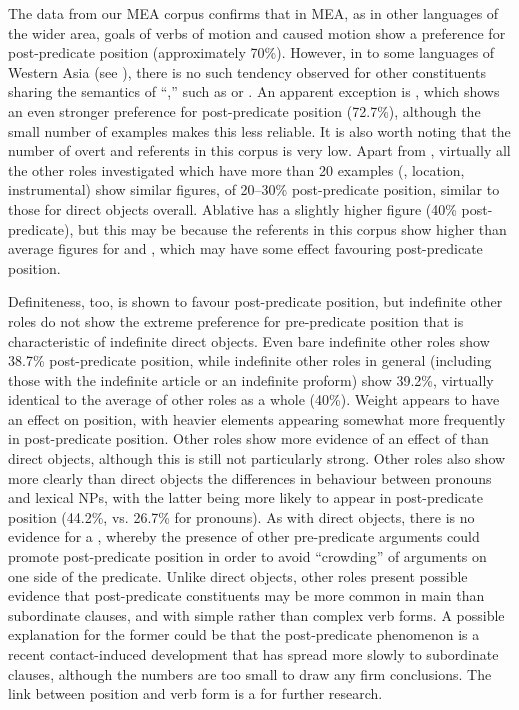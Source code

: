 \documentclass[output=paper,colorlinks,citecolor=brown,draftmode]{langscibook}
\begin{document}
The data from our MEA corpus confirms that in MEA, as in other languages of the wider area, goals of verbs of motion and caused motion show a preference for post-predicate position (approximately 70\%). However, in  to some languages of Western Asia (see ), there is no such tendency observed for other constituents sharing the semantics of ``,'' such as  or . An apparent exception is , which shows an even stronger preference for post-predicate position (72.7\%), although the small number of examples makes this less reliable. It is also worth noting that the number of overt  and  referents in this corpus is very low. Apart from , virtually all the other roles investigated which have more than 20 examples (, location, instrumental) show similar figures, of 20--30\% post-predicate position, similar to those for direct objects overall. Ablative has a slightly higher figure (40\% post-predicate), but this may be because the  referents in this corpus show higher than average figures for  and , which may have some effect favouring post-predicate position.

Definiteness, too, is shown to favour post-predicate position, but indefinite other roles do not show the extreme preference for pre-predicate position that is characteristic of indefinite direct objects. Even bare indefinite other roles show 38.7\% post-predicate position, while indefinite other roles in general (including those with the indefinite article or an indefinite proform) show 39.2\%, virtually identical to the average of other roles as a whole (40\%). Weight appears to have an effect on position, with heavier elements appearing somewhat more frequently in post-predicate position. Other roles show more evidence of an effect of  than direct objects, although this is still not particularly strong. Other roles also show more clearly than direct objects the differences in behaviour between pronouns and lexical NPs, with the latter being more likely to appear in post-predicate position (44.2\%, vs. 26.7\% for pronouns). As with direct objects, there is no evidence for a , whereby the presence of other pre-predicate arguments could promote post-predicate position in order to avoid ``crowding'' of arguments on one side of the predicate. Unlike direct objects, other roles present possible evidence that post-predicate constituents may be more common in main than subordinate clauses, and with simple rather than complex verb forms. A possible explanation for the former could be that the post-predicate  phenomenon is a recent contact-induced development that has spread more slowly to subordinate clauses, although the numbers are too small to draw any firm conclusions. The link between  position and verb form is a  for further research.
\end{document}
